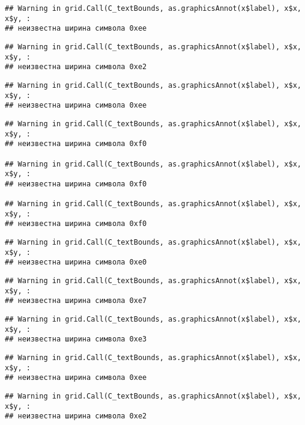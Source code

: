 \documentclass[
]{article}
\begin{document}
\begin{verbatim}
## Warning in grid.Call(C_textBounds, as.graphicsAnnot(x$label), x$x, x$y, :
## неизвестна ширина символа 0xee
\end{verbatim}

\begin{verbatim}
## Warning in grid.Call(C_textBounds, as.graphicsAnnot(x$label), x$x, x$y, :
## неизвестна ширина символа 0xe2
\end{verbatim}

\begin{verbatim}
## Warning in grid.Call(C_textBounds, as.graphicsAnnot(x$label), x$x, x$y, :
## неизвестна ширина символа 0xee
\end{verbatim}

\begin{verbatim}
## Warning in grid.Call(C_textBounds, as.graphicsAnnot(x$label), x$x, x$y, :
## неизвестна ширина символа 0xf0

## Warning in grid.Call(C_textBounds, as.graphicsAnnot(x$label), x$x, x$y, :
## неизвестна ширина символа 0xf0

## Warning in grid.Call(C_textBounds, as.graphicsAnnot(x$label), x$x, x$y, :
## неизвестна ширина символа 0xf0
\end{verbatim}

\begin{verbatim}
## Warning in grid.Call(C_textBounds, as.graphicsAnnot(x$label), x$x, x$y, :
## неизвестна ширина символа 0xe0
\end{verbatim}

\begin{verbatim}
## Warning in grid.Call(C_textBounds, as.graphicsAnnot(x$label), x$x, x$y, :
## неизвестна ширина символа 0xe7
\end{verbatim}

\begin{verbatim}
## Warning in grid.Call(C_textBounds, as.graphicsAnnot(x$label), x$x, x$y, :
## неизвестна ширина символа 0xe3
\end{verbatim}

\begin{verbatim}
## Warning in grid.Call(C_textBounds, as.graphicsAnnot(x$label), x$x, x$y, :
## неизвестна ширина символа 0xee
\end{verbatim}

\begin{verbatim}
## Warning in grid.Call(C_textBounds, as.graphicsAnnot(x$label), x$x, x$y, :
## неизвестна ширина символа 0xe2
\end{verbatim}
\end{document}
